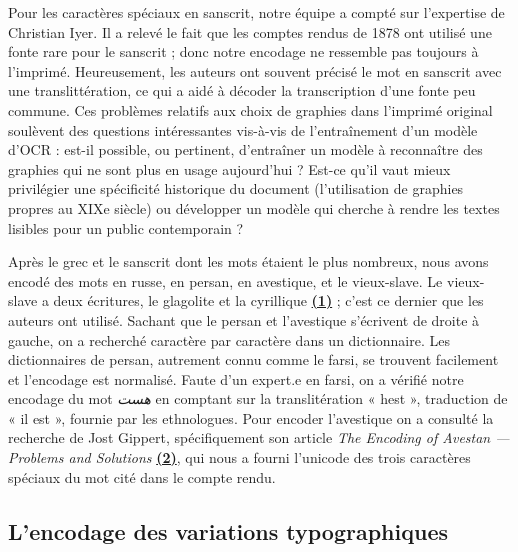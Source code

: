 \documentclass{article}
\begin{document}
	Pour les caractères spéciaux en sanscrit, notre équipe a compté sur l’expertise de Christian Iyer. Il a relevé le fait que les comptes rendus de 1878 ont utilisé une fonte rare pour le sanscrit ; donc notre encodage ne ressemble pas toujours à l’imprimé. Heureusement, les auteurs ont souvent précisé le mot en sanscrit avec une translittération, ce qui a aidé à décoder la transcription d’une fonte peu commune. Ces problèmes relatifs aux choix de graphies dans l'imprimé original soulèvent des questions intéressantes vis-à-vis de l'entraînement d'un modèle d'OCR : est-il possible, ou pertinent, d'entraîner un modèle à reconnaître des graphies qui ne sont plus en usage aujourd'hui ? Est-ce qu'il vaut mieux privilégier une spécificité historique du document (l'utilisation de graphies propres au XIXe siècle) ou développer un modèle qui cherche à rendre les textes lisibles pour un public contemporain ?
	
	Après le grec et le sanscrit dont les mots étaient le plus nombreux, nous avons encodé des mots en russe, en persan, en avestique, et le vieux-slave. Le vieux-slave a deux écritures, le glagolite et la cyrillique \underline{\textbf{(1)}} ; c'est ce dernier que les auteurs ont utilisé. Sachant que le persan et l’avestique s’écrivent de droite à gauche, on a recherché caractère par caractère dans un dictionnaire. Les dictionnaires de persan, autrement connu comme le farsi, se trouvent facilement et l’encodage est normalisé. Faute d’un expert.e en farsi, on a vérifié notre encodage du mot \textit{ هست }en comptant sur la translitération « hest », traduction de « il est », fournie par les ethnologues. Pour encoder l’avestique on a consulté la recherche de Jost Gippert, spécifiquement son article \textit{The Encoding of Avestan — Problems and Solutions} \underline{\textbf{(2)}}, qui nous a fourni l’unicode des trois caractères spéciaux du mot cité dans le compte rendu.
	
	
	\subsection{L'encodage des variations typographiques}
	
\end{document}
